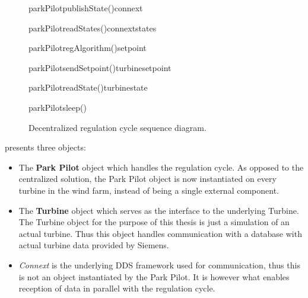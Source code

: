 \begin{figure}
	\centering
	\begin{sequencediagram} %
		
		\begin {messcall}{parkPilot}{publishState()}{connext}{}
		\end {messcall}
		\begin {call}{parkPilot}{readStates()}{connext}{states}
		\end {call}
		\begin {callself}{parkPilot}{regAlgorithm()}{setpoint}
		\end {callself}
		\begin {call}{parkPilot}{sendSetpoint()}{turbine}{setpoint}
		\end {call}
		\begin {call}{parkPilot}{readState()}{turbine}{state}
		\end {call}	
		\begin {callself}{parkPilot}{sleep()}{}
		\end {callself}
	\end{sequencediagram}

	\caption[Decentralized regulation cycle sequence diagram]{
		\label{fig:decenRegCycle} 
		\footnotesize{%
			Decentralized regulation cycle sequence diagram.
		}
	}
\end{figure}

 presents three objects:

\begin{itemize}
	\item The \textbf{Park Pilot} object which handles the regulation cycle. As opposed to the centralized solution, the Park Pilot object is now instantiated on every turbine in the wind farm, instead of being a single external component.
	\item The \textbf{Turbine} object which serves as the interface to the underlying Turbine. The Turbine object for the purpose of this thesis is just a simulation of an actual turbine. Thus this object handles communication with a database with actual turbine data provided by Siemens.
	\item \textit{Connext} is the underlying DDS framework used for communication, thus this is not an object instantiated by the Park Pilot. It is however what enables reception of data in parallel with the regulation cycle. 
\end{itemize}

